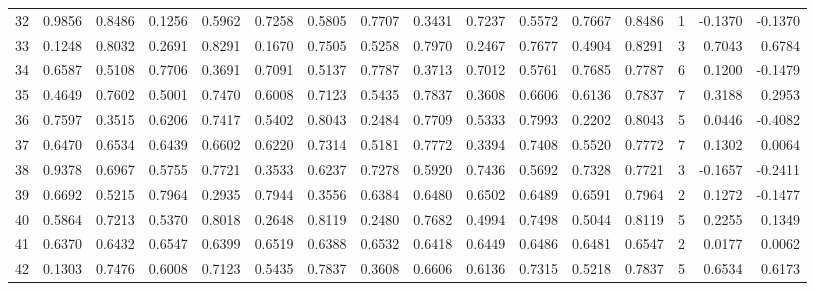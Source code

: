 \begin{tabular}{lrrrrrrrrrrrrrrr}
32  &      0.9856 &  0.8486 &  0.1256 &  0.5962 &  0.7258 &  0.5805 &  0.7707 &  0.3431 &  0.7237 &  0.5572 &   0.7667 &     0.8486 &      1 &                   -0.1370 &                    -0.1370 \\
33  &      0.1248 &  0.8032 &  0.2691 &  0.8291 &  0.1670 &  0.7505 &  0.5258 &  0.7970 &  0.2467 &  0.7677 &   0.4904 &     0.8291 &      3 &                    0.7043 &                     0.6784 \\
34  &      0.6587 &  0.5108 &  0.7706 &  0.3691 &  0.7091 &  0.5137 &  0.7787 &  0.3713 &  0.7012 &  0.5761 &   0.7685 &     0.7787 &      6 &                    0.1200 &                    -0.1479 \\
35  &      0.4649 &  0.7602 &  0.5001 &  0.7470 &  0.6008 &  0.7123 &  0.5435 &  0.7837 &  0.3608 &  0.6606 &   0.6136 &     0.7837 &      7 &                    0.3188 &                     0.2953 \\
36  &      0.7597 &  0.3515 &  0.6206 &  0.7417 &  0.5402 &  0.8043 &  0.2484 &  0.7709 &  0.5333 &  0.7993 &   0.2202 &     0.8043 &      5 &                    0.0446 &                    -0.4082 \\
37  &      0.6470 &  0.6534 &  0.6439 &  0.6602 &  0.6220 &  0.7314 &  0.5181 &  0.7772 &  0.3394 &  0.7408 &   0.5520 &     0.7772 &      7 &                    0.1302 &                     0.0064 \\
38  &      0.9378 &  0.6967 &  0.5755 &  0.7721 &  0.3533 &  0.6237 &  0.7278 &  0.5920 &  0.7436 &  0.5692 &   0.7328 &     0.7721 &      3 &                   -0.1657 &                    -0.2411 \\
39  &      0.6692 &  0.5215 &  0.7964 &  0.2935 &  0.7944 &  0.3556 &  0.6384 &  0.6480 &  0.6502 &  0.6489 &   0.6591 &     0.7964 &      2 &                    0.1272 &                    -0.1477 \\
40  &      0.5864 &  0.7213 &  0.5370 &  0.8018 &  0.2648 &  0.8119 &  0.2480 &  0.7682 &  0.4994 &  0.7498 &   0.5044 &     0.8119 &      5 &                    0.2255 &                     0.1349 \\
41  &      0.6370 &  0.6432 &  0.6547 &  0.6399 &  0.6519 &  0.6388 &  0.6532 &  0.6418 &  0.6449 &  0.6486 &   0.6481 &     0.6547 &      2 &                    0.0177 &                     0.0062 \\
42  &      0.1303 &  0.7476 &  0.6008 &  0.7123 &  0.5435 &  0.7837 &  0.3608 &  0.6606 &  0.6136 &  0.7315 &   0.5218 &     0.7837 &      5 &                    0.6534 &                     0.6173 \\

\end{tabular}
